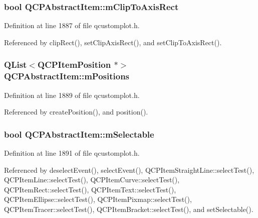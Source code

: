 \subsubsection[{m\+Clip\+To\+Axis\+Rect}]{\setlength{\rightskip}{0pt plus 5cm}bool Q\+C\+P\+Abstract\+Item\+::m\+Clip\+To\+Axis\+Rect\hspace{0.3cm}{\ttfamily [protected]}}\label{class_q_c_p_abstract_item_ad2a70ff6b658fcb84a9427f69d3f587d}


Definition at line 1887 of file qcustomplot.\+h.



Referenced by clip\+Rect(), set\+Clip\+Axis\+Rect(), and set\+Clip\+To\+Axis\+Rect().

\hypertarget{class_q_c_p_abstract_item_a96cab718644f27490f9d967c49fcd18c}{}
\subsubsection[{m\+Positions}]{\setlength{\rightskip}{0pt plus 5cm}Q\+List$<${\bf Q\+C\+P\+Item\+Position} $\ast$$>$ Q\+C\+P\+Abstract\+Item\+::m\+Positions\hspace{0.3cm}{\ttfamily [protected]}}\label{class_q_c_p_abstract_item_a96cab718644f27490f9d967c49fcd18c}


Definition at line 1889 of file qcustomplot.\+h.



Referenced by create\+Position(), and position().

\hypertarget{class_q_c_p_abstract_item_ad81eb35c8726a0f458db9df9732e0e41}{}
\subsubsection[{m\+Selectable}]{\setlength{\rightskip}{0pt plus 5cm}bool Q\+C\+P\+Abstract\+Item\+::m\+Selectable\hspace{0.3cm}{\ttfamily [protected]}}\label{class_q_c_p_abstract_item_ad81eb35c8726a0f458db9df9732e0e41}


Definition at line 1891 of file qcustomplot.\+h.



Referenced by deselect\+Event(), select\+Event(), Q\+C\+P\+Item\+Straight\+Line\+::select\+Test(), Q\+C\+P\+Item\+Line\+::select\+Test(), Q\+C\+P\+Item\+Curve\+::select\+Test(), Q\+C\+P\+Item\+Rect\+::select\+Test(), Q\+C\+P\+Item\+Text\+::select\+Test(), Q\+C\+P\+Item\+Ellipse\+::select\+Test(), Q\+C\+P\+Item\+Pixmap\+::select\+Test(), Q\+C\+P\+Item\+Tracer\+::select\+Test(), Q\+C\+P\+Item\+Bracket\+::select\+Test(), and set\+Selectable().

